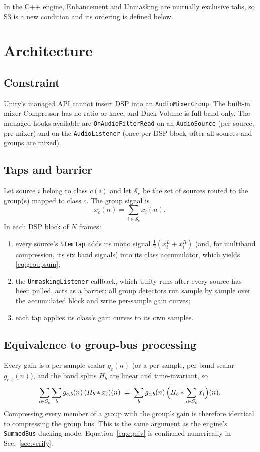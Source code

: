 \documentclass[11pt]{article}
\newcommand{\code}[1]{\texttt{#1}}
\begin{document}
In the C++ engine, Enhancement and Unmasking are mutually exclusive tabs, so
S3 is a new condition and its ordering is defined below.

\section{Architecture}
\label{sec:arch}

\subsection{Constraint}
Unity's managed API cannot insert DSP into an \code{AudioMixerGroup}. The
built-in mixer Compressor has no ratio or knee, and Duck Volume is full-band
only. The managed hooks available are \code{OnAudioFilterRead} on an
\code{AudioSource} (per source, pre-mixer) and on the \code{AudioListener}
(once per DSP block, after all sources and groups are mixed).

\subsection{Taps and barrier}
Let source $i$ belong to class $c(i)$ and let $\mathcal{S}_c$ be the set of
sources routed to the group(s) mapped to class $c$. The group signal is
\begin{equation}
  x_c(n) = \sum_{i \in \mathcal{S}_c} x_i(n).
  \label{eq:groupsum}
\end{equation}
In each DSP block of $N$ frames:
\begin{enumerate}[nosep]
  \item every source's \code{StemTap} adds its mono signal
        $\tfrac{1}{2}(x_i^L + x_i^R)$ (and, for multiband compression, its six
        band signals) into its class accumulator, which yields
        \eqref{eq:groupsum};
  \item the \code{UnmaskingListener} callback, which Unity runs after every
        source has been pulled, acts as a barrier: all group detectors run
        sample by sample over the accumulated block and write per-sample gain
        curves;
  \item each tap applies its class's gain curves to its own samples.
\end{enumerate}

\subsection{Equivalence to group-bus processing}
Every gain is a per-sample scalar $g_c(n)$ (or a per-sample, per-band scalar
$g_{c,b}(n)$), and the band splits $H_b$ are linear and time-invariant, so
\begin{equation}
  \sum_{i \in \mathcal{S}_c} \sum_b g_{c,b}(n)\,(H_b * x_i)(n)
  \;=\; \sum_b g_{c,b}(n)\,\Bigl(H_b * \sum_{i\in\mathcal{S}_c} x_i\Bigr)(n).
  \label{eq:equiv}
\end{equation}
Compressing every member of a group with the group's gain is therefore
identical to compressing the group bus. This is the same argument as the
engine's \code{SummedBus} ducking mode. Equation~\eqref{eq:equiv} is
confirmed numerically in Sec.~\ref{sec:verify}.
\end{document}
